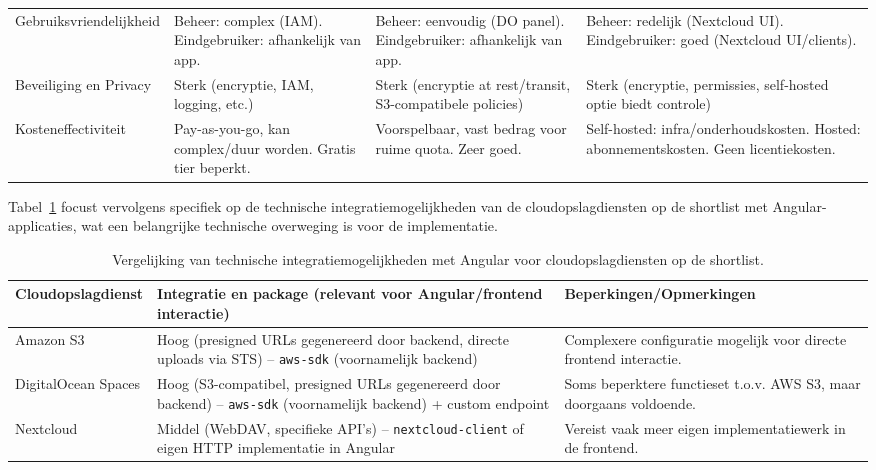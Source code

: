 \begin{table}[H]
\begin{tabularx}{\textwidth}{lXXX}
        Gebruiksvriendelijkheid & Beheer: complex (IAM). Eindgebruiker: afhankelijk van app. & Beheer: eenvoudig (DO panel). Eindgebruiker: afhankelijk van app. & Beheer: redelijk (Nextcloud UI). Eindgebruiker: goed (Nextcloud UI/clients). \\
        Beveiliging en Privacy & Sterk (encryptie, IAM, logging, etc.) & Sterk (encryptie at rest/transit, S3-compatibele policies) & Sterk (encryptie, permissies, self-hosted optie biedt controle) \\
        Kosteneffectiviteit & Pay-as-you-go, kan complex/duur worden. Gratis tier beperkt. & Voorspelbaar, vast bedrag voor ruime quota. Zeer goed. & Self-hosted: infra/onderhoudskosten. Hosted: abonnementskosten. Geen licentiekosten. \\
        \bottomrule
    \end{tabularx}
\end{table}

Tabel~\ref{tab:cloud-integratie-vergelijking-angular} focust vervolgens specifiek op de technische integratiemogelijkheden van de cloudopslagdiensten op de shortlist met Angular-applicaties, wat een belangrijke technische overweging is voor de implementatie.

\begin{table}[H]
    \centering
    \footnotesize
    \begin{tabular}{l p{5cm} p{5cm}}
      \toprule
      \textbf{Cloudopslagdienst} & \textbf{Integratie en package (relevant voor Angular/frontend interactie)} & \textbf{Beperkingen/Opmerkingen} \\
      \midrule
      Amazon S3 & Hoog (presigned URLs gegenereerd door backend, directe uploads via STS) – \texttt{aws-sdk} (voornamelijk backend) & Complexere configuratie mogelijk voor directe frontend interactie. \\
      DigitalOcean Spaces & Hoog (S3-compatibel, presigned URLs gegenereerd door backend) – \texttt{aws-sdk} (voornamelijk backend) + custom endpoint & Soms beperktere functieset t.o.v. AWS S3, maar doorgaans voldoende. \\
      Nextcloud & Middel (WebDAV, specifieke API's) – \texttt{nextcloud-client} of eigen HTTP implementatie in Angular & Vereist vaak meer eigen implementatiewerk in de frontend. \\
      \bottomrule
    \end{tabular}
    \caption[Vergelijking technische integratiemogelijkheden met Angular]{\label{tab:cloud-integratie-vergelijking-angular}Vergelijking van technische integratiemogelijkheden met Angular voor cloudopslagdiensten op de shortlist.}
\end{table}

